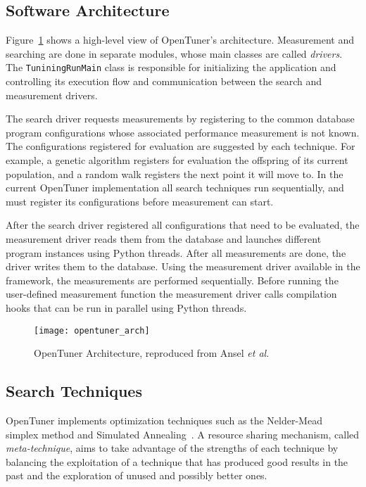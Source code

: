 \subsection{Software Architecture}
\label{sec:arch}

Figure~\ref{fig:ot-imp} shows a high-level view of OpenTuner's architecture.
Measurement and searching are done in separate modules, whose main classes are
called \emph{drivers}. The \texttt{TuniningRunMain} class is responsible for
initializing the application and controlling its execution flow and
communication between the search and measurement drivers.

The search driver requests measurements by registering to the common database
program configurations whose associated performance measurement is not known.
The configurations registered for evaluation are suggested by each technique.
For example, a genetic algorithm registers for evaluation the offspring of its
current population, and a random walk registers the next point it will move to.
In the current OpenTuner implementation all search techniques run sequentially,
and must register its configurations before measurement can start.

After the search driver registered all configurations that need to be
evaluated, the measurement driver reads them from the database and launches
different program instances using Python threads. After all measurements are
done, the driver writes them to the database. Using the measurement driver
available in the framework, the measurements are performed sequentially.
Before running the user-defined measurement function the measurement driver
calls compilation hooks that can be run in parallel using Python threads.

\begin{figure}[htpb]
    \centering
    \texttt{[image: opentuner\_arch]}
    \caption{OpenTuner Architecture, reproduced from Ansel \emph{et
    al.}~\cite{ansel2014opentuner}}
    \label{fig:ot-imp}
\end{figure}

\subsection{Search Techniques}
\label{sec:techniques}

OpenTuner implements optimization techniques such as the
Nelder-Mead~\cite{nelder1965simplex} simplex method and Simulated
Annealing~\cite{kirkpatrick1983optimization}. A resource sharing mechanism,
called \emph{meta-technique}, aims to take advantage of the strengths of each
technique by balancing the exploitation of a technique that has produced good
results in the past and the exploration of unused and possibly better ones.

